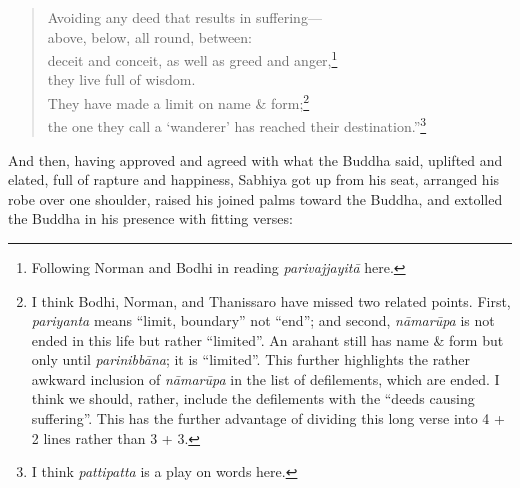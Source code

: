 \documentclass[12pt,openany]{book}%
\begin{document}
\begin{verse}
Avoiding any deed that results in suffering—\\
above, below, all round, between: \\
deceit and conceit, as well as greed and anger,\footnote{Following Norman and Bodhi in reading \textit{\textsanskrit{parivajjayitā}} here. } \\
they live full of wisdom. \\
They have made a limit on name \& form;\footnote{I think Bodhi, Norman, and Thanissaro have missed two related points. First, \textit{pariyanta} means “limit, boundary” not “end”; and second, \textit{\textsanskrit{nāmarūpa}} is not ended in this life but rather “limited”. An arahant still has name \& form but only until \textit{\textsanskrit{parinibbāna}}; it is “limited”. This further highlights the rather awkward inclusion of \textit{\textsanskrit{nāmarūpa}} in the list of defilements, which are ended. I think we should, rather, include the defilements with the “deeds causing suffering”. This has the further advantage of dividing this long verse into 4 + 2 lines rather than 3 + 3. } \\
the one they call a ‘wanderer’ has reached their destination.”\footnote{I think \textit{pattipatta} is a play on words here. } 

%
\end{verse}

And then, having approved and agreed with what the Buddha said, uplifted and elated, full of rapture and happiness, Sabhiya got up from his seat, arranged his robe over one shoulder, raised his joined palms toward the Buddha, and extolled the Buddha in his presence with fitting verses: 
\end{document}
